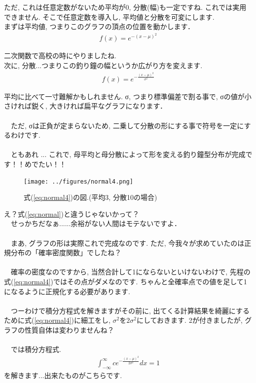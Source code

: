\documentclass[11pt,a4paper,uplatex]{ujreport} 	%
\begin{document}
ただ, これは任意定数がないため平均が0, 分散(幅)も一定ですね. これでは実用できません. そこで任意定数を導入し, 平均値と分散を可変にします. \\

まずは平均値, つまりこのグラフの頂点の位置を動かします．\\

\begin{align}
\label{eq:normal3}
f(x) = e^{-(x-\mu)^2}
\end{align}

二次関数で高校の時にやりましたね.\\

次に, 分散...つまりこの釣り鐘の幅というか広がり方を変えます. \\

\begin{align}
\label{eq:normal4}
f(x) = e^{-\frac{(x-\mu)^2}{\sigma^2}}
\end{align}

平均に比べて一寸難解かもしれません. σ, つまり標準偏差で割る事で, σの値が小さければ鋭く, 大きければ扁平なグラフになります．\\
\\
　ただ, σは正負が定まらないため, 二乗して分散の形にする事で符号を一定にするわけです. \\
\\
　ともあれ ... これで, 母平均と母分散によって形を変える釣り鐘型分布が完成です！！めでたい！！\\

\begin{figure}[H]
\label{im:normal}
  \centering
  \texttt{[image: ../figures/normal4.png]}
  \caption{式(\ref{eq:normal4})の図.(平均3, 分散10の場合)}
\end{figure}

え？式(\ref{eq:normal})と違うじゃないかって？\\
　せっかちだなぁ......余裕がない人間はモテないですよ．\\
\\
　まあ, グラフの形は実際これで完成なのです. ただ, 今我々が求めていたのは正規分布の「確率密度関数」でしたね？\\
\\
　確率の密度なのですから, 当然合計して1にならないといけないわけで, 先程の式(\ref{eq:normal4})ではその点がダメなのです. ちゃんと全確率点での値を足して1になるように正規化する必要があります.\\
\\
　つーわけで積分方程式を解きますがその前に, 出てくる計算結果を綺麗にするために式(\ref{eq:normal4})に細工をし, $\sigma^2$を$2\sigma^2$にしておきます. 2が付きましたが, グラフの性質自体は変わりませんね？\\
\\
　では積分方程式.
\begin{align}
\int_{-\infty}^{\infty} c e^{-\frac{(x-\mu)^2}{2\sigma^2}} dx= 1
\end{align}
を解きます...出来たものがこちらです.
\end{document}

